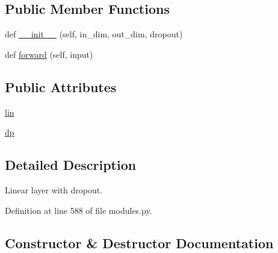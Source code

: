 \subsection*{Public Member Functions}
\begin{DoxyCompactItemize}
\item 
def \hyperlink{classprojects_1_1personality__captions_1_1transresnet_1_1modules_1_1LinearWrapper_a2e10c4bb01e3df60871dc6b0ac5c88a7}{\+\_\+\+\_\+init\+\_\+\+\_\+} (self, in\+\_\+dim, out\+\_\+dim, dropout)
\item 
def \hyperlink{classprojects_1_1personality__captions_1_1transresnet_1_1modules_1_1LinearWrapper_a01b6a807a29f852bbd6109ce1f105f6b}{forward} (self, input)
\end{DoxyCompactItemize}
\subsection*{Public Attributes}
\begin{DoxyCompactItemize}
\item 
\hyperlink{classprojects_1_1personality__captions_1_1transresnet_1_1modules_1_1LinearWrapper_a8411866655bcc0a2d1f81872d690f0bd}{lin}
\item 
\hyperlink{classprojects_1_1personality__captions_1_1transresnet_1_1modules_1_1LinearWrapper_a82d3bfca084c402ccc7d94e8db852610}{dp}
\end{DoxyCompactItemize}


\subsection{Detailed Description}
\begin{DoxyVerb}Linear layer with dropout.
\end{DoxyVerb}
 

Definition at line 588 of file modules.\+py.



\subsection{Constructor \& Destructor Documentation}
\mbox{\label{classprojects_1_1personality__captions_1_1transresnet_1_1modules_1_1LinearWrapper_a2e10c4bb01e3df60871dc6b0ac5c88a7}} 
